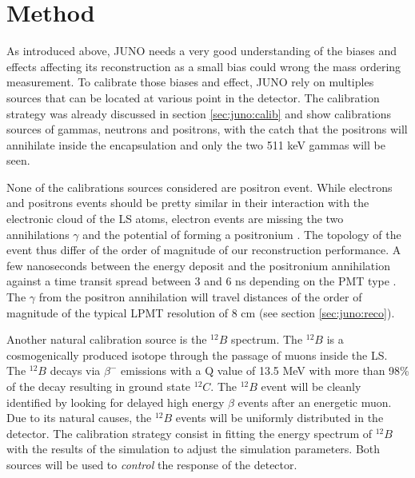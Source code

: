 \documentclass[../main.tex]{subfiles}
\begin{document}
\section{Method}
\label{sec:janne:method}

As introduced above, JUNO needs a very good understanding of the biases and effects affecting its reconstruction as a small bias could wrong the mass ordering measurement. To calibrate those biases and effect, JUNO rely on multiples sources that can be located at various point in the detector. The calibration strategy was already discussed in section \ref{sec:juno:calib} and show calibrations sources of gammas, neutrons and positrons, with the catch that the positrons will annihilate inside the encapsulation and only the two 511 keV gammas will be seen.

None of the calibrations sources considered are positron event. While electrons and positrons events should be pretty similar in their interaction with the electronic cloud of the LS atoms, electron events are missing the two annihilations $\gamma$ and the potential of forming a positronium \cite{schwarz_measurements_2018}. The topology of the event thus differ of the order of magnitude of our reconstruction performance. A few nanoseconds between the energy deposit and  the positronium annihilation against a time transit spread between 3 and 6 ns depending on the PMT type \cite{rodphai_20-inch_2021, liao_study_2017, li_characterization_2018}. The $\gamma$ from the positron annihilation will travel distances of the order of magnitude of the typical LPMT resolution of 8 cm (see section \ref{sec:juno:reco}).

Another natural calibration source is the $^{12}B$ spectrum. The $^{12}B$ is a cosmogenically produced isotope through the passage of muons inside the LS. The $^{12}B$ decays via $\beta^-$ emissions with a Q value of 13.5 MeV with more than 98\% of the decay resulting in ground state $^{12}C$. The $^{12}B$ event will be cleanly identified by looking for delayed high energy $\beta$ events after an energetic muon. Due to its natural causes, the $^{12}B$ events will be uniformly distributed in the detector. The calibration strategy consist in fitting the energy spectrum of $^{12}B$ with the results of the simulation to adjust the simulation parameters. Both sources will be used to \textit{control} the response of the detector.
\end{document}
